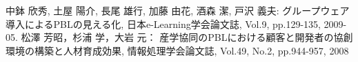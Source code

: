 \documentclass[a4j,twoside]{jarticle}
\newcommand{\me}{中鉢 欣秀}
\begin{document}
\begin{multicols}{2}
\begin{thebibliography}{99}
		 \me, 土屋 陽介, 長尾 雄行, 加藤 由花, 酒森 潔, 戸沢 義夫: グループウェア導入によるPBLの見える化, 日本e-Learning学会論文誌, Vol.9, pp.129-135, 2009-05.
		 松澤 芳昭，杉浦 学，大岩 元： 産学協同のPBLにおける顧客と開発者の協創環境の構築と人材育成効果, 情報処理学会論文誌,  Vol.49, No.2, pp.944-957, 2008
	\end{thebibliography}
\newpage
\end{multicols}
\end{document}
